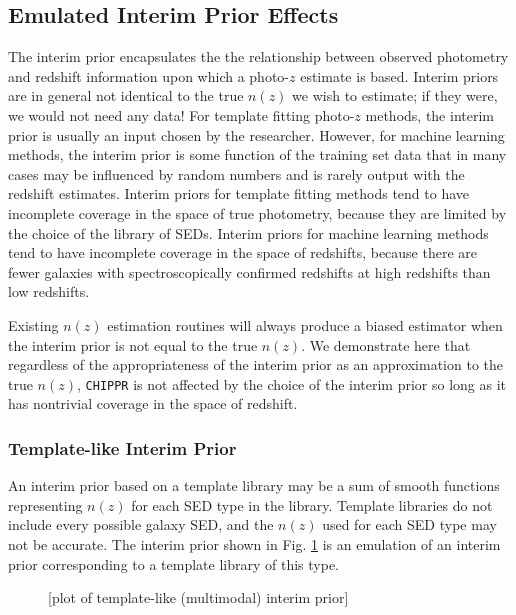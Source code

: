 \documentclass[iop]{emulateapj}
\newcommand{\chippr}{\texttt{CHIPPR} }
\begin{document}
\subsection{Emulated Interim Prior Effects}
\label{sec:priors}

The interim prior encapsulates the the relationship between observed photometry 
and redshift information upon which a photo-$z$ estimate is based.  Interim 
priors are in general not identical to the true $n(z)$ we wish to estimate; if 
they were, we would not need any data!  For template fitting photo-$z$ methods, 
the interim prior is usually an input chosen by the researcher.  However, for 
machine learning methods, the interim prior is some function of the training 
set data that in many cases may be influenced by random numbers and is rarely 
output with the redshift estimates.  Interim priors for template fitting 
methods tend to have incomplete coverage in the space of true photometry, 
because they are limited by the choice of the library of SEDs.  Interim priors 
for machine learning methods tend to have incomplete coverage in the space of 
redshifts, because there are fewer galaxies with spectroscopically confirmed 
redshifts at high redshifts than low redshifts.

Existing $n(z)$ estimation routines will always produce a biased estimator when 
the interim prior is not equal to the true $n(z)$.  We demonstrate here that 
regardless of the appropriateness of the interim prior as an approximation to 
the true $n(z)$, \chippr is not affected by the choice of the interim prior so 
long as it has nontrivial coverage in the space of redshift.

\subsubsection{Template-like Interim Prior}
\label{sec:tempintpr}

An interim prior based on a template library may be a sum of smooth functions 
representing $n(z)$ for each SED type in the library.  Template libraries do 
not include every possible galaxy SED, and the $n(z)$ used for each SED type 
may not be accurate.  The interim prior shown in Fig. \ref{fig:tempintpr} is an 
emulation of an interim prior corresponding to a template library of this type.

\begin{figure}
	\begin{center}
		\caption{[plot of template-like (multimodal) interim prior]}
		\label{fig:tempintpr}
	\end{center}
\end{figure}
\end{document}

